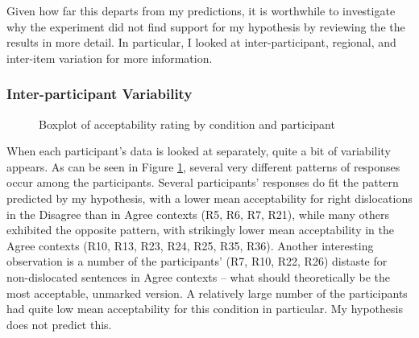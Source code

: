 \documentclass[titlepage,12pt]{article}
\begin{document}
Given how far this departs from my predictions, it is worthwhile to investigate why the experiment did not find support for my hypothesis by reviewing the the results in more detail. In particular, I looked at inter-participant, regional, and inter-item variation for more information.


\subsubsection{Inter-participant Variability}

\begin{figure}[bt]
\centering
\noindent
{}
\caption{Boxplot of acceptability rating by condition and participant}
\label{bypart2}
\end{figure}

When each participant's data is looked at separately, quite a bit of variability appears. As can be seen in Figure \ref{bypart2}, several very different patterns of responses occur among the participants. Several participants' responses do fit the pattern predicted by my hypothesis, with a lower mean acceptability for right dislocations in the Disagree than in Agree contexts (R5, R6, R7, R21), while many others exhibited the opposite pattern, with strikingly lower mean acceptability in the Agree contexts (R10, R13, R23, R24, R25, R35, R36). Another interesting observation is a number of the participants' (R7, R10, R22, R26) distaste for non-dislocated sentences in Agree contexts -- what should theoretically be the most acceptable, unmarked version. A relatively large number of the participants had quite low mean acceptability for this condition in particular. My hypothesis does not predict this.
\end{document}
